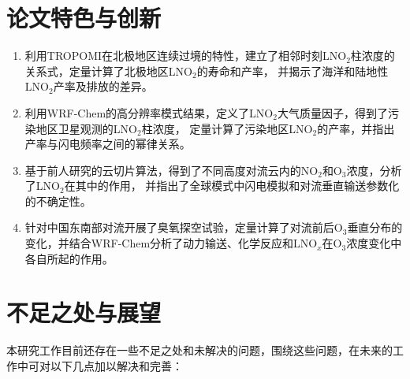 \section{论文特色与创新}

\begin{enumerate}[label=（\arabic*）, labelindent=\parindent, nosep, leftmargin=0pt, widest=0, itemindent=*, topsep=0pt, partopsep=0pt, parsep=0pt]

\item 利用TROPOMI在北极地区连续过境的特性，建立了相邻时刻LNO$_2$柱浓度的关系式，定量计算了北极地区LNO$_2$的寿命和产率，
并揭示了海洋和陆地性LNO$_2$产率及排放的差异。

\item 利用WRF-Chem的高分辨率模式结果，定义了LNO$_2$大气质量因子，得到了污染地区卫星观测的LNO$_2$柱浓度，
定量计算了污染地区LNO$_2$的产率，并指出产率与闪电频率之间的幂律关系。

\item 基于前人研究的云切片算法，得到了不同高度对流云内的NO$_2$和O$_3$浓度，分析了LNO$_2$在其中的作用，
并指出了全球模式中闪电模拟和对流垂直输送参数化的不确定性。

\item 针对中国东南部对流开展了臭氧探空试验，定量计算了对流前后O$_3$垂直分布的变化，并结合WRF-Chem分析了动力输送、化学反应和LNO$_x$在O$_3$浓度变化中各自所起的作用。

\end{enumerate}



\section{不足之处与展望}

本研究工作目前还存在一些不足之处和未解决的问题，围绕这些问题，在未来的工作中可对以下几点加以解决和完善：

